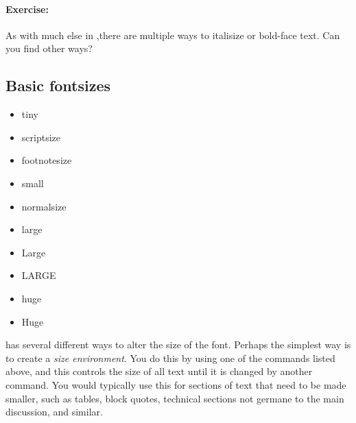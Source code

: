         \paragraph{Exercise:}As with much else in \LaTeXe,there are multiple ways to italisize or bold-face text. Can you find other ways?



        \subsection{Basic fontsizes}
        \label{Basic fontsizes}
        
        \begin{framed}
            \begin{itemize}
                \item{tiny}
                \item{scriptsize}
                \item{footnotesize}
                \item{small}
                \item{normalsize}
                \item{large}
                \item{Large}
                \item{LARGE}
                \item{huge}
                \item{Huge}
            \end{itemize}
        \end{framed}

\LaTeXe{} has several different ways to alter the size of the font. Perhaps the simplest way is to create a \textit{size environment}. You do this by using one of the commands listed above, and this controls the size of all text until it is changed by another command. You would typically use this for sections of text that need to be made smaller, such as tables, block quotes, technical sections not germane to the main discussion, and similar.

